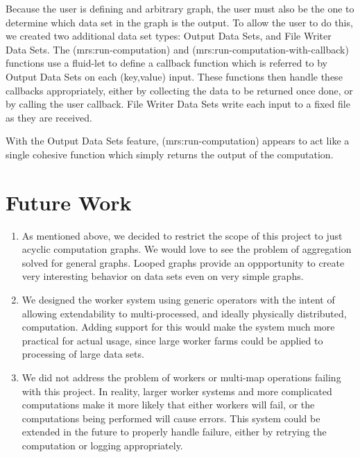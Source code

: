 \documentclass{article}
\begin{document}
Because the user is defining and arbitrary graph, the user must also be the one
to determine which data set in the graph is the output. To allow the user to do
this, we created two additional data set types: Output Data Sets, and File Writer Data Sets.
The (mrs:run-computation) and (mrs:run-computation-with-callback) functions use
a fluid-let to define a callback function which is referred to by Output Data Sets
on each (key,value) input. These functions then handle these callbacks appropriately,
either by collecting the data to be returned once done, or by calling the user
callback. File Writer Data Sets write each input to a fixed file as they are received.

With the Output Data Sets feature, (mrs:run-computation) appears to act like a
single cohesive function which simply returns the output of the computation.

\section{Future Work}

\begin{enumerate}
\item As mentioned above, we decided to restrict the scope of this project to just
  acyclic computation graphs. We would love to see the problem of aggregation
  solved for general graphs. Looped graphs provide an oppportunity to create
  very interesting behavior on data sets even on very simple graphs.
\item We designed the worker system using generic operators with the intent of
  allowing extendability to multi-processed, and ideally physically distributed,
  computation. Adding support for this would make the system much more practical
  for actual usage, since large worker farms could be applied to processing of
  large data sets.
\item We did not address the problem of workers or multi-map operations failing
  with this project. In reality, larger worker systems and more complicated
  computations make it more likely that either workers will fail, or the computations
  being performed will cause errors. This system could be extended in the future
  to properly handle failure, either by retrying the computation or logging
  appropriately.
\end{enumerate}
\end{document}
